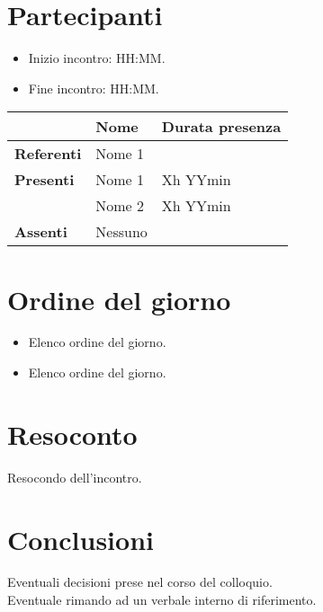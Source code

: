 \documentclass[a4paper, 12pt]{article}
\begin{document}
\copertina{}

\newpage

\section{Partecipanti}

\begin{itemize}
    \item Inizio incontro: HH:MM.
    \item Fine incontro: HH:MM.
\end{itemize}


\begin{center}
{\renewcommand{\arraystretch}{1.5}
\begin{tabular}{l|ll}
	                    & \textbf{Nome} & \textbf{Durata presenza} 	\\
	\hline
	\textbf{Referenti} 	& Nome 1 		&			\\
	\hline
	\textbf{Presenti}   & Nome 1		& Xh YYmin  \\  
						& Nome 2		& Xh YYmin  \\  
	\hline
	\textbf{Assenti}	& Nessuno		&			\\
\end{tabular}	
}
\end{center}


\section{Ordine del giorno}
\begin{itemize}
	\item Elenco ordine del giorno.
	\item Elenco ordine del giorno.
\end{itemize}

\section{Resoconto}
Resocondo dell'incontro.

\section{Conclusioni}
Eventuali decisioni prese nel corso del colloquio. \\
Eventuale rimando ad un verbale interno di riferimento.
\end{document}
